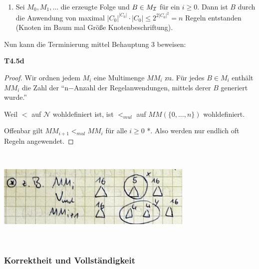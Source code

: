 \begin{enumerate}
\begin{quote}
\begin{proof}
\begin{enumerate}
\def\labelenumi{\alph{enumi}.}
\item
  $\exists$-Regel

Dann $\exists r.C \in L\left( v \right)$ und es wird neues $v^{'}$
auf Tiefe $i + 1$ generiert mit
$L\left( v^{'} \right) = \left\{ C \right\}$. Es gilt
$\text{rd}\left( C \right) = rd\left( \exists r.C \right) - 1 \leq rd\left( C_{0} \right) - i - 1 = rd\left( C_{0} \right) - (i + 1)$
 \end{enumerate}
\end{proof}
\end{quote}

\item
  Sei $M_{0},M_{1},\ldots$ die erzeugte Folge und $B \in M_{\mathcal{I}}$ für
  ein $i \geq 0$. Dann ist $B$ durch die Anwendung von maximal
  $\left| C_{0} \right|^{\left| C_{0} \right|} \cdot \left| C_{0} \right| \leq 2^{2\left| C_{0} \right|^{2}} = n$ Regeln entstanden (Knoten im Baum mal Größe Knotenbeschriftung).

\end{enumerate}

Nun kann die Terminierung mittel Behauptung 3 beweisen:

\textbf{T4.5d}

\begin{proof}
Wir ordnen jedem $M_i$ eine Multimenge $MM_i$ zu. Für jedes $B \in M_i$ enthält $MM_i$ die Zahl der ``n$-$Anzahl der Regelanwendungen, mittels derer $B$ generiert wurde.''

Weil $<$ auf $\mathcal{N}$ wohldefiniert ist, ist $<_{mul}$ auf $MM(\{0,\ldots,n\})$ wohldefiniert.

Offenbar gilt $MM_{i+1} <_{mul} MM_i$ für alle $i \geq 0$ *. Also werden nur endlich oft Regeln angewendet.
\end{proof}

\includegraphics[width=3.71910in,height=1.83200in]{media/45mm.png}

\subsubsection{Korrektheit und Vollständigkeit}

